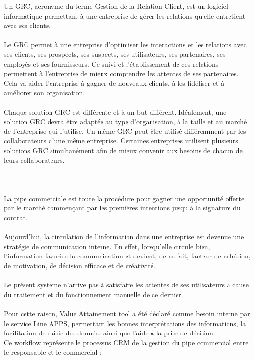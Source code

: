 Un GRC, acronyme du terme Gestion de la Relation Client, est un logiciel informatique permettant à une entreprise de gérer les relations qu’elle entretient avec ses clients.
\\\\
Le GRC permet à une entreprise d’optimiser les interactions et les relations avec ses clients, ses prospects, ses suspects, ses utilisateurs, ses partenaires, ses employés et ses fournisseurs. Ce suivi et l’établissement de ces relations permettent à l’entreprise de mieux comprendre les attentes de ses partenaires. Cela va aider l’entreprise à gagner de nouveaux clients, à les fidéliser et à améliorer son organisation.
\\\\
Chaque solution GRC est différente et à un but différent. Idéalement, une solution GRC devra être adaptée au type d’organisation, à la taille et au marché de l’entreprise qui l’utilise. Un même GRC peut être utilisé différemment par les collaborateurs d’une même entreprise. Certaines entreprises utilisent plusieurs solutions GRC simultanément afin de mieux convenir aux besoins de chacun de leurs collaborateurs.
\\\\
\newpage
\\\\
La pipe commerciale est toute la procédure pour gagner une opportunité offerte par le marché commençant par les premières intentions jusqu’à la signature du contrat.
\\\\
Aujourd’hui, la circulation de l’information dans une entreprise est devenue une stratégie de communication interne. En effet, lorsqu’elle circule bien, l’information favorise la communication et devient, de ce fait, facteur de cohésion, de motivation, de décision efficace et de créativité.
\\\\
Le présent système n’arrive pas à satisfaire les attentes de ses utilisateurs à cause du traitement et du fonctionnement manuelle de ce dernier.
\\\\
Pour cette raison, Value Attainement tool a été déclaré comme besoin interne par le service Line APPS, permettant les bonnes interprétations des informations, la facilitation de saisie des données ainsi que l’aide à la prise de décision.
\\

Ce workflow représente le processus CRM de la gestion du pipe commercial entre le
responsable et le commercial : 



